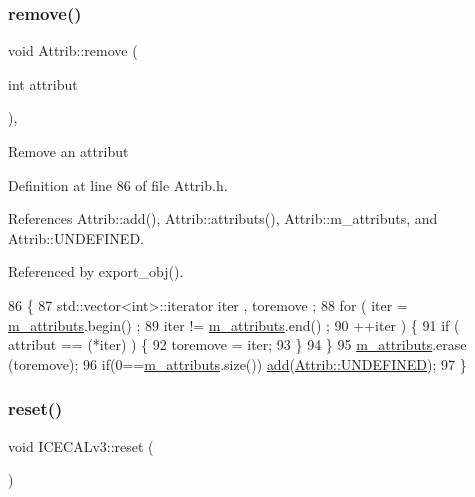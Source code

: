 \subsubsection{\texorpdfstring{remove()}{remove()}}
{\footnotesize\ttfamily void Attrib\+::remove (\begin{DoxyParamCaption}\item[{int}]{attribut }\end{DoxyParamCaption})\hspace{0.3cm}{\ttfamily [inline]}, {\ttfamily [inherited]}}

Remove an attribut 

Definition at line 86 of file Attrib.\+h.



References Attrib\+::add(), Attrib\+::attributs(), Attrib\+::m\+\_\+attributs, and Attrib\+::\+U\+N\+D\+E\+F\+I\+N\+ED.



Referenced by export\+\_\+obj().


\begin{DoxyCode}
86                                \{
87     std::vector<int>::iterator iter , toremove ;
88     \textcolor{keywordflow}{for} ( iter  = \hyperlink{classAttrib_ac4bd58a0cc6b38a3b711d609a3d3aacc}{m\_attributs}.begin() ;
89           iter != \hyperlink{classAttrib_ac4bd58a0cc6b38a3b711d609a3d3aacc}{m\_attributs}.end()   ;
90           ++iter ) \{
91       \textcolor{keywordflow}{if} ( attribut == (*iter) ) \{
92         toremove = iter;
93       \}
94     \}
95     \hyperlink{classAttrib_ac4bd58a0cc6b38a3b711d609a3d3aacc}{m\_attributs}.erase (toremove);
96     \textcolor{keywordflow}{if}(0==\hyperlink{classAttrib_ac4bd58a0cc6b38a3b711d609a3d3aacc}{m\_attributs}.size()) \hyperlink{classAttrib_a235f773af19c900264a190b00a3b4ad7}{add}(\hyperlink{classAttrib_a69e171d7cc6417835a5a306d3c764235a3a8da2ab97dda18aebab196fe4100531}{Attrib::UNDEFINED});
97   \}
\end{DoxyCode}
\mbox{\label{classICECALv3_a33afc7c8e0f399336152abd03cbe8d1b}} 
\subsubsection{\texorpdfstring{reset()}{reset()}}
{\footnotesize\ttfamily void I\+C\+E\+C\+A\+Lv3\+::reset (\begin{DoxyParamCaption}{ }\end{DoxyParamCaption})\hspace{0.3cm}{\ttfamily [virtual]}}

